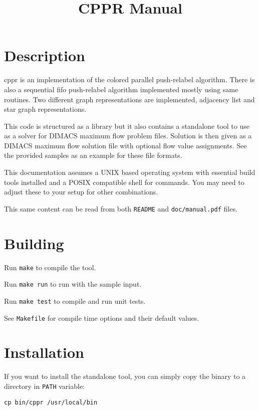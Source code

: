 \documentclass{article}
\begin{document}
\title{CPPR Manual}
\author{}
\date{}

\maketitle

\section{Description}

cppr is an implementation of the colored parallel push-relabel algorithm.
There is also a sequential fifo push-relabel algorithm implemented mostly
using same routines. Two different graph representations are implemented,
adjacency list and star graph representations.

This code is structured as a library but it also contains a standalone tool
to use as a solver for DIMACS maximum flow problem files. Solution is then
given as a DIMACS maximum flow solution file with optional flow value
assignments. See the provided samples as an example for these file formats.

This documentation assumes a UNIX based operating system with essential
build tools installed and a POSIX compatible shell for commands. You may
need to adjust these to your setup for other combinations.

This same content can be read from both \texttt{README} and \texttt{doc/manual.pdf} files.

\section{Building}

Run \texttt{make} to compile the tool.

Run \texttt{make run} to run with the sample input.

Run \texttt{make test} to compile and run unit tests.

See \texttt{Makefile} for compile time options and their default values.

\section{Installation}

If you want to install the standalone tool, you can simply copy the binary
to a directory in \texttt{PATH} variable:

\begin{verbatim}
cp bin/cppr /usr/local/bin
\end{verbatim}
\end{document}
